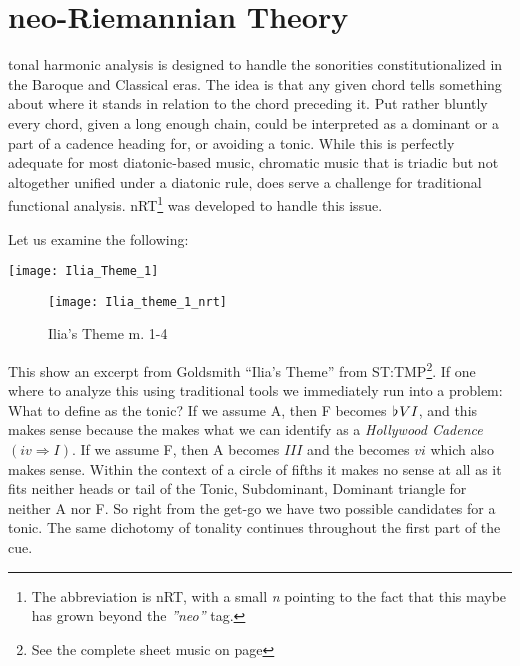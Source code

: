 
\chapter{neo-Riemannian Theory}\label{ch:nrt}

 tonal harmonic analysis is designed to handle the sonorities constitutionalized in the Baroque and Classical eras. The idea is that any given chord tells something about where it stands in relation to the chord preceding it. Put rather bluntly every chord, given a long enough chain, could be interpreted as a dominant or a part of a cadence heading for, or avoiding a tonic. While this is perfectly adequate for most diatonic-based music, chromatic music that is triadic but not altogether unified under a diatonic rule, does serve a challenge for traditional functional analysis. \acf{nRT}\footnote{The abbreviation is nRT, with a small \textit{n} pointing to the fact that this maybe has grown beyond the \textit{''neo''} tag. } was developed to handle this issue.

Let us examine the following:

\begin{figure*}[h!]
\texttt{[image: Ilia\_Theme\_1]}
	\caption{Ilia's Theme 1}
	\label{Ilia_Theme_1}
\end{figure*}

\begin{figure}[h!]
\center
\texttt{[image: Ilia\_theme\_1\_nrt]}
	\caption{Ilia's Theme m. 1-4}
	\label{Ilia_theme_1_nrt}
\end{figure}

\noindent This show an excerpt from Goldsmith ``Ilia's Theme'' from \ac{ST:TMP}\footnote{See the complete sheet music on page \pageref{Ilias_Theme}}. If one where to analyze this using traditional tools we immediately run into a problem: What to define as the tonic? If we assume A, then F becomes \(\hspace*{0.18ex}\flat\hspace*{0.18ex}{VI}\), and this makes sense because the  makes what we can identify as a \textit{Hollywood Cadence} \(({iv}\Rightarrow{I})\). If we assume F, then A becomes \(III\) and the  becomes \(vi\) which also makes sense. Within the context of a circle of fifths it makes no sense at all as it fits neither heads or tail of the Tonic, Subdominant, Dominant triangle for neither A nor F. So right from the get-go we have two possible candidates for a tonic. The same dichotomy of tonality continues throughout the first part of the cue.

